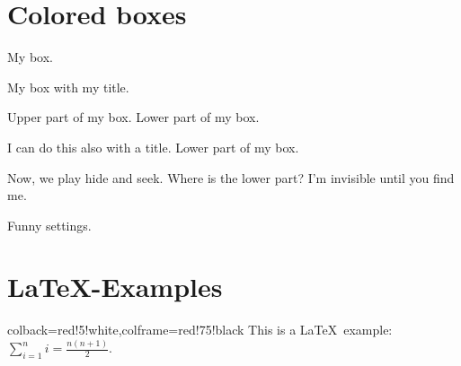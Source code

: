 \documentclass{article}
\begin{document}
\section{Colored boxes}

\begin{tcolorbox}[colback=red!5!white,colframe=red!75!black]
  My box.
\end{tcolorbox}

\begin{tcolorbox}[colback=blue!5!white,colframe=blue!75!black,title=My title]
  My box with my title.
\end{tcolorbox}

\begin{tcolorbox}[colback=green!5!white,colframe=green!75!black]
  Upper part of my box.
  \tcblower
  Lower part of my box.
\end{tcolorbox}

\begin{tcolorbox}[colback=yellow!5!white,colframe=yellow!75!black,title=My title]
  I can do this also with a title.
  \tcblower
  Lower part of my box.
\end{tcolorbox}

\begin{tcolorbox}[colback=yellow!10!white,colframe=red!75!black,lowerbox=invisible,
  savelowerto=\jobname_ex.tex]
  Now, we play hide and seek. Where is the lower part?
  \tcblower
  I'm invisible until you find me.
\end{tcolorbox}

\begin{tcolorbox}[colback=yellow!10!white,colframe=red!75!black,title=Here I am]
  
\end{tcolorbox}


\begin{tcolorbox}[colback=blue!50!white,colframe=blue!25!black,coltext=yellow,
    fontupper=\Large\bfseries,arc=6mm,boxrule=2mm,boxsep=5mm]
  Funny settings.
\end{tcolorbox}


\clearpage
\section{\LaTeX-Examples}

\begin{tcblisting}{colback=red!5!white,colframe=red!75!black}
This is a \LaTeX\ example:
$\displaystyle\sum\limits_{i=1}^n i = \frac{n(n+1)}{2}$.
\end{tcblisting}
\end{document}
